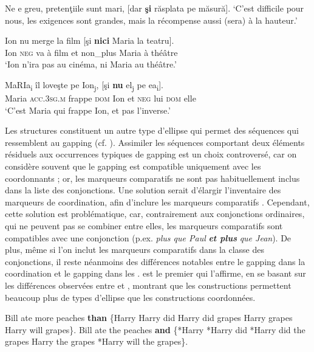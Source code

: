 \ea \label{ch2:ex63}
\ea Ne e greu, pretenţiile sunt mari, [dar \textbf{şi} răsplata pe măsură].
\glt ‘C’est difficile pour nous, les exigences sont grandes, mais la récompense aussi (sera) à la hauteur.’       

\ex  
\gll Ion  nu  merge  la  film  [şi  \textbf{nici}  Maria  la  teatru].\\
Ion  \textsc{neg}  va  à  film  et  non\_plus  Maria  à  théâtre\\
\glt ‘Ion n’ira pas au cinéma, ni Maria au théâtre.’

\ex  
\gll MaRIa\textsubscript{i}  îl  loveşte  pe  Ion\textsubscript{j},  [şi  \textbf{nu}  el\textsubscript{j}  pe  ea\textsubscript{i}].\\
Maria  \textsc{acc.3sg.m}  frappe  \textsc{dom}  Ion  et  \textsc{neg}  lui  \textsc{dom}  elle\\ 
\glt ‘C’est Maria qui frappe Ion, et pas l’inverse.’      
\z
\z

Les structures  constituent un autre type d’ellipse qui permet des séquences qui ressemblent au gapping (cf. \citealt{Zribi-Hertz1986,CulicoverEtAl2005,AmsiliEtAl2008}). Assimiler les séquences  comportant deux éléments résiduels aux occurrences typiques de gapping est un choix controversé, car on considère souvent que le gapping est compatible uniquement avec les coordonnants ; or, les marqueurs comparatifs ne sont pas habituellement inclus dans la liste des conjonctions. Une solution serait d’élargir l’inventaire des marqueurs de coordination, afin d’inclure les marqueurs comparatifs \citep{MatosEtAl2008}. Cependant, cette solution est problématique, car, contrairement aux conjonctions ordinaires, qui ne peuvent pas se combiner entre elles, les marqueurs comparatifs sont compatibles avec une conjonction (p.ex. \textit{plus que Paul} \textbf{\textit{et plus}}\textit{ que Jean}). De plus, même si l’on inclut les marqueurs comparatifs dans la classe des conjonctions, il reste néanmoins des différences notables entre le gapping dans la coordination et le gapping dans les . \citet{Jackendoff1971} est le premier qui l’affirme, en se basant sur les différences observées entre  et , montrant que les constructions  permettent beaucoup plus de types d’ellipse que les constructions coordonnées.

\ea
\ea Bill ate more peaches \textbf{than} \{Harry {\textbar} Harry did {\textbar} Harry did grapes {\textbar} Harry grapes {\textbar} Harry will grapes\}. \label{ch2:ex64a}      
\ex Bill ate the peaches \textbf{and} \{*Harry {\textbar} *Harry did {\textbar} *Harry did the grapes {\textbar} Harry the grapes {\textbar} *Harry will the grapes\}. \label{ch2:ex64b}
\z
\z

